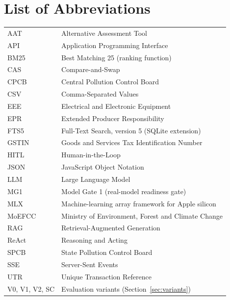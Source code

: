 \chapter*{List of Abbreviations}
\thispagestyle{frontmatter}
\begin{tabular}{@{}p{3.2cm}l@{}}
AAT & Alternative Assessment Tool \\
API & Application Programming Interface \\
BM25 & Best Matching 25 (ranking function) \\
CAS & Compare-and-Swap \\
CPCB & Central Pollution Control Board \\
CSV & Comma-Separated Values \\
EEE & Electrical and Electronic Equipment \\
EPR & Extended Producer Responsibility \\
FTS5 & Full-Text Search, version 5 (SQLite extension) \\
GSTIN & Goods and Services Tax Identification Number \\
HITL & Human-in-the-Loop \\
JSON & JavaScript Object Notation \\
LLM & Large Language Model \\
MG1 & Model Gate 1 (real-model readiness gate) \\
MLX & Machine-learning array framework for Apple silicon \\
MoEFCC & Ministry of Environment, Forest and Climate Change \\
RAG & Retrieval-Augmented Generation \\
ReAct & Reasoning and Acting \\
SPCB & State Pollution Control Board \\
SSE & Server-Sent Events \\
UTR & Unique Transaction Reference \\
V0, V1, V2, SC & Evaluation variants (Section~\ref{sec:variants}) \\
\end{tabular}

\clearpage
\pagestyle{mainbody}














\appendix




